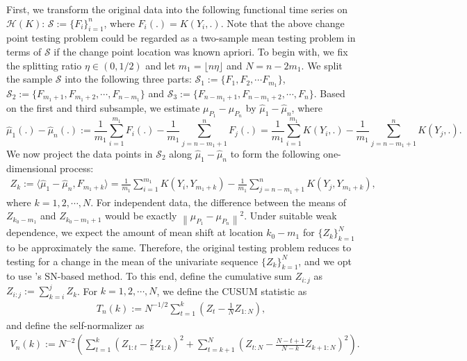 \documentclass[11pt]{article}
\theoremstyle{plain}
\theoremstyle{definition}
\theoremstyle{remark}
\begin{document}
\indent First, we transform the original data into the following functional time series on $\mathcal{H}(K)$: $\mathcal{S}:=\{F_i\}_{i=1}^n$, where $F_i(.)=K(Y_i,.)$. Note that the above change point testing problem could be regarded  as a two-sample mean testing problem in terms of $\mathcal{S}$ if the change point location was known apriori. 
To begin with, we fix the splitting ratio $\eta \in (0,1/2)$ and let $m_1=\lfloor n \eta \rfloor$ and $N=n-2m_1$. We split the sample  $\mathcal{S}$ into the following three parts: $\mathcal{S}_1:=\{F_1,F_2,\cdots F_{m_1}\}$, $\mathcal{S}_2:=\{F_{m_1+1},F_{m_1+2},\cdots,F_{n-m_1}\}$ and $\mathcal{S}_3:=\{F_{n-m_1+1}, F_{n-m_1+2},\cdots,F_n\}$. Based on the first and third subsample, we estimate $\mu_{P_1}-\mu_{P_n}$ by $\hat{\mu}_1-\hat{\mu}_n$, where
\begin{equation}\label{eqn:CPD_projection}
  \hat{\mu}_1(.)-\hat{\mu}_n(.):=\frac{1}{m_1}\sum_{i=1}^{m_1}F_i(.)-\frac{1}{m_1}\sum_{j=n-m_1+1}^{n}F_j(.)=\frac{1}{m_1}\sum_{i=1}^{m_1}K(Y_i,.)-\frac{1}{m_1}\sum_{j=n-m_1+1}^{n}K(Y_j,.).  
\end{equation}
We now project the data points in $\mathcal{S}_2$ along $\hat{\mu}_1-\hat{\mu}_n$ to form the following one-dimensional process:
\begin{align*}
    Z_k:=\langle \hat{\mu}_1-\hat{\mu}_n, F_{m_1+k}\rangle = \frac{1}{m_1}\sum_{i=1}^{m_1}K(Y_i,Y_{m_1+k})-\frac{1}{m_1}\sum_{j=n-m_1+1}^{n}K(Y_j,Y_{m_1+k}),
\end{align*}
where $k=1,2,\cdots,N.$ For independent data, the difference between the means of $Z_{k_0-m_1}$ and $Z_{k_0-m_1+1}$ would be exactly $\left\|\mu_{P_1}-\mu_{P_n}\right\|^2$. Under suitable weak dependence, we expect the amount of mean shift at location $k_0-m_1$ for $\{Z_k\}_{k=1}^{N}$ to be approximately the same.  Therefore, the original testing problem reduces to testing for a change in the mean of the univariate sequence $\{Z_k\}_{k=1}^{N}$, and we opt to use \cite{shao2010testing}'s SN-based method. To this end, define the cumulative sum $Z_{i:j}$  as $Z_{i:j}:=\sum_{k=i}^jZ_k$. For $k=1,2,\cdots,N$, we define the CUSUM statistic as
\begin{align*}
    T_n(k):=N^{-1/2}\sum_{t=1}^k \left(Z_t-\frac{1}{N}Z_{1:N}\right),
\end{align*}
and define the self-normalizer as
\begin{align*}
    V_n(k):=N^{-2}\left(\sum_{t=1}^k\left(Z_{1:t}-\frac{t}{k}Z_{1:k}\right)^2+\sum_{t=k+1}^{N}\left(Z_{t:N}-\frac{N-t+1}{N-k}Z_{k+1:N}\right)^2\right).
\end{align*}
\end{document}
